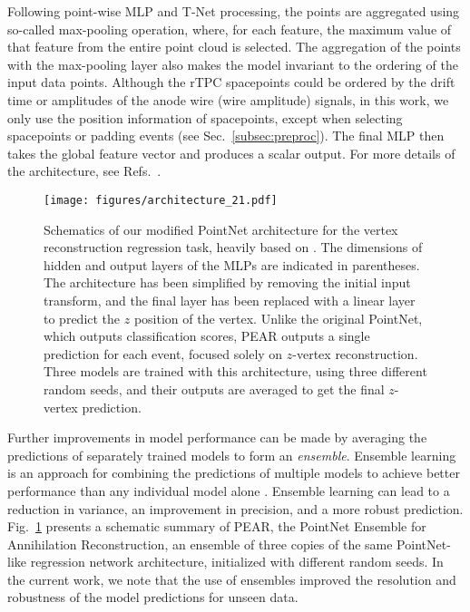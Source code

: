 \documentclass[a4paper,11pt]{article}
\begin{document}
Following point-wise MLP and T-Net processing, the points are aggregated using so-called max-pooling operation, where, for each feature, the maximum value of that feature from the entire point cloud is selected. The aggregation of the points with the max-pooling layer also makes the model invariant to the ordering of the input data points. Although the rTPC spacepoints could be ordered by the drift time or amplitudes of the anode wire (wire amplitude) signals, in this work, we only use the position information of spacepoints, except when selecting spacepoints or padding events (see Sec.~\ref{subsec:preproc}). The final MLP then takes the global feature vector and produces a scalar output. For more details of the architecture, see Refs.~\cite{Qi2017, pointnetpp}.

\begin{figure}[htbp]
    \centering
    \texttt{[image: figures/architecture\_21.pdf]}
    \caption{\label{fig:architecture} Schematics of our modified PointNet architecture for the vertex reconstruction regression task, heavily based on \cite{Qi2017}. The dimensions of hidden and output layers of the MLPs are indicated in parentheses. The architecture has been simplified by removing the initial input transform, and the final layer has been replaced with a linear layer to predict the $z$ position of the vertex. Unlike the original PointNet, which outputs classification scores, PEAR outputs a single prediction for each event, focused solely on $z$-vertex reconstruction. Three models are trained with this architecture, using three different random seeds, and their outputs are averaged to get the final $z$-vertex prediction.} 
\end{figure}


Further improvements in model performance can be made by averaging the predictions of separately trained models to form an \textit{ensemble}. Ensemble learning is an approach for combining the predictions of multiple models to achieve better performance than any individual model alone \cite{Breiman1996BaggingP, ensemble_survey_1, ensemble_survey_2}. Ensemble learning can lead to a reduction in variance, an improvement in precision, and a more robust prediction.
Fig.~\ref{fig:architecture} presents a schematic summary of PEAR, the PointNet Ensemble for Annihilation Reconstruction, an ensemble of three copies of the same PointNet-like regression network architecture, initialized with different random seeds. 
In the current work, we note that the use of ensembles improved the resolution and robustness of the model predictions for unseen data.
\end{document}
